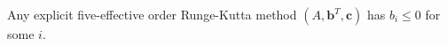 \begin{theorem}\label{thm:positiveb}
    Any explicit five-effective order Runge-Kutta method $(A,\bm{b}^{T},\bm{c})$ has $b_{i} \leq 0$ for some $i$.
\end{theorem}
